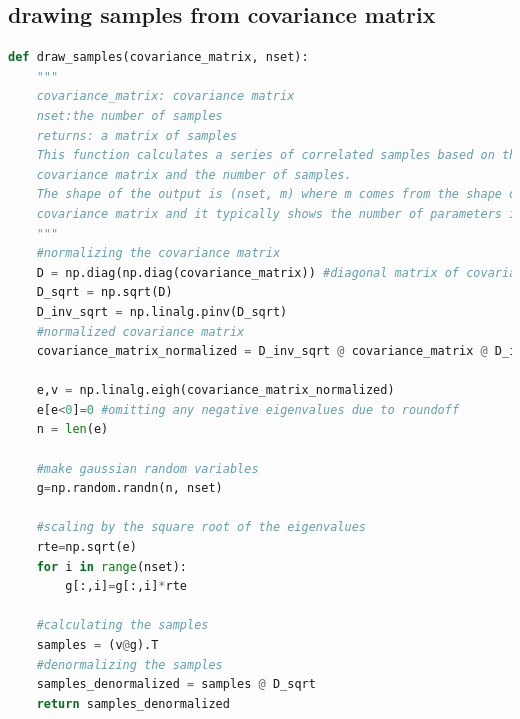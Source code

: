 \documentclass[12pt, TexShade, letterpaper]{report}
\begin{document}
\subsection{drawing samples from covariance matrix}
\label{chap:appendix,sub:draw}
\begin{lstlisting}[language=Python, caption=Python example]
    def draw_samples(covariance_matrix, nset):
    """
    covariance_matrix: covariance matrix
    nset:the number of samples
    returns: a matrix of samples
    This function calculates a series of correlated samples based on the presented 
    covariance matrix and the number of samples.
    The shape of the output is (nset, m) where m comes from the shape of 
    covariance matrix and it typically shows the number of parameters in the model.
    """
    #normalizing the covariance matrix
    D = np.diag(np.diag(covariance_matrix)) #diagonal matrix of covariance matrix
    D_sqrt = np.sqrt(D)
    D_inv_sqrt = np.linalg.pinv(D_sqrt)
    #normalized covariance matrix
    covariance_matrix_normalized = D_inv_sqrt @ covariance_matrix @ D_inv_sqrt 

    e,v = np.linalg.eigh(covariance_matrix_normalized)
    e[e<0]=0 #omitting any negative eigenvalues due to roundoff
    n = len(e)

    #make gaussian random variables
    g=np.random.randn(n, nset)

    #scaling by the square root of the eigenvalues
    rte=np.sqrt(e)
    for i in range(nset):
        g[:,i]=g[:,i]*rte

    #calculating the samples
    samples = (v@g).T
    #denormalizing the samples
    samples_denormalized = samples @ D_sqrt
    return samples_denormalized
\end{lstlisting}
	{
	
	
	
	
	}
\end{document}
